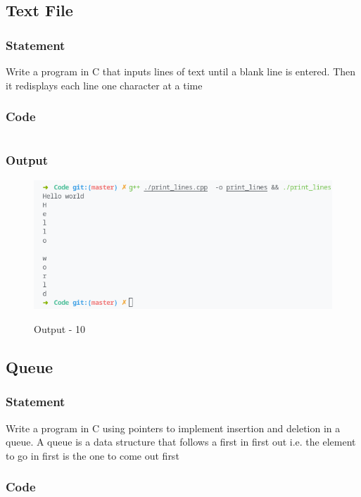\pagebreak
\subsection{Text File}
\subsubsection{Statement}
Write a program in C that inputs lines of text until a blank line is entered. Then it redisplays
each line one character at a time
\subsubsection{Code}
\inputminted[]{c}{../Code/print_lines.cpp}
\subsubsection{Output}
\begin{figure}[!htb]
  \centering
  \includegraphics[width=5in]{Images/print_lines.png}
  \label{Output-10}
  \caption{Output - 10}
\end{figure}

\pagebreak
\subsection{Queue}
\subsubsection{Statement}
Write a program in C using pointers to implement insertion and deletion in a queue. A queue
is a data structure that follows a first in first out i.e. the element to go in first is the one to come
out first
\subsubsection{Code}
\inputminted[]{c}{../Code/q.cpp}
\pagebreak
